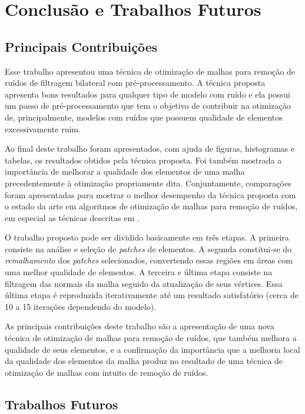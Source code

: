 \chapter{Conclusão e Trabalhos Futuros}
\label{chap:conclusao-e-trabalhos-futuros}

\section{Principais Contribuições} 
Esse trabalho apresentou uma técnica de otimização de malhas para remoção de ruídos de filtragem bilateral com pré-processamento. A técnica proposta apresenta bons resultados para qualquer tipo de modelo com ruído e ela possui um passo de pré-processamento que tem o objetivo de contribuir na otimização de, principalmente, modelos com ruídos que possuem qualidade de elementos excessivamente ruim.

Ao final deste trabalho foram apresentados, com ajuda de figuras, histogramas e tabelas, os resultados obtidos pela técnica proposta. Foi também mostrada a importância de melhorar a qualidade dos elementos de uma malha precedentemente à otimização propriamente dita. Conjuntamente, comparações foram apresentadas para mostrar o melhor desempenho da técnica proposta com o estado da arte em algoritmos de otimização de malhas para remoção de ruídos, em especial as técnicas descritas em \cite{zhang2015guided, sun2007fast, zheng2011bilateral}.

O trabalho proposto pode ser dividido basicamente em três etapas. A primeira consiste na análise e seleção de \textit{patches} de elementos. A segunda constitui-se do \textit{remalhamento} dos \textit{patches} selecionados, convertendo essas regiões em áreas com uma melhor qualidade de elementos. A terceira e última etapa consiste na filtragem das normais da malha seguido da atualização de seus vértices. Essa última etapa é reproduzida iterativamente até um resultado satisfatório (cerca de 10 a 15 iterações dependendo do modelo).

As principais contribuições deste trabalho são a apresentação de uma nova técnica de otimização de malhas para remoção de ruídos, que também melhora a qualidade de seus elementos, e a confirmação da importância que a melhoria local da qualidade dos elementos da malha produz no resultado de uma técnica de otimização de malhas com intuito de remoção de ruídos.

\section{Trabalhos Futuros}

